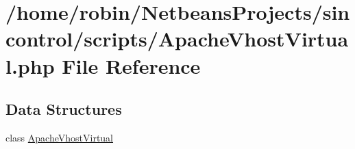 \hypertarget{scripts_2_apache_vhost_virtual_8php}{}\section{/home/robin/\+Netbeans\+Projects/sincontrol/scripts/\+Apache\+Vhost\+Virtual.php File Reference}
\label{scripts_2_apache_vhost_virtual_8php}
\subsection*{Data Structures}
\begin{DoxyCompactItemize}
\item 
class \hyperlink{class_apache_vhost_virtual}{Apache\+Vhost\+Virtual}
\end{DoxyCompactItemize}
